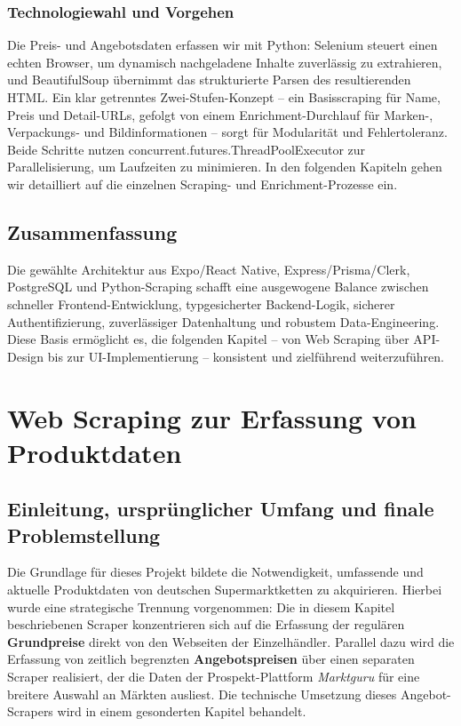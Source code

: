 \documentclass[12pt, a4paper]{report} %
\begin{document}
\subsection{Technologiewahl und Vorgehen}
Die Preis- und Angebotsdaten erfassen wir mit Python: Selenium steuert einen echten Browser, um dynamisch nachgeladene Inhalte zuverlässig zu extrahieren, und BeautifulSoup übernimmt das strukturierte Parsen des resultierenden HTML. Ein klar getrenntes Zwei-Stufen-Konzept – ein Basisscraping für Name, Preis und Detail-URLs, gefolgt von einem Enrichment-Durchlauf für Marken-, Verpackungs- und Bildinformationen – sorgt für Modularität und Fehlertoleranz. Beide Schritte nutzen concurrent.futures.ThreadPoolExecutor zur Parallelisierung, um Laufzeiten zu minimieren. In den folgenden Kapiteln gehen wir detailliert auf die einzelnen Scraping- und Enrichment-Prozesse ein.

\section{Zusammenfassung}
Die gewählte Architektur aus Expo/React Native, Express/Prisma/Clerk, PostgreSQL und Python-Scraping schafft eine ausgewogene Balance zwischen schneller Frontend-Entwicklung, typgesicherter Backend-Logik, sicherer Authentifizierung, zuverlässiger Datenhaltung und robustem Data-Engineering. Diese Basis ermöglicht es, die folgenden Kapitel – von Web Scraping über API-Design bis zur UI-Implementierung – konsistent und zielführend weiterzuführen.

\chapter{Web Scraping zur Erfassung von Produktdaten}
\label{chap:web_scraping}

\section{Einleitung, ursprünglicher Umfang und finale Problemstellung}
Die Grundlage für dieses Projekt bildete die Notwendigkeit, umfassende und aktuelle Produktdaten von deutschen Supermarktketten zu akquirieren. Hierbei wurde eine strategische Trennung vorgenommen: Die in diesem Kapitel beschriebenen Scraper konzentrieren sich auf die Erfassung der regulären \textbf{Grundpreise} direkt von den Webseiten der Einzelhändler. Parallel dazu wird die Erfassung von zeitlich begrenzten \textbf{Angebotspreisen} über einen separaten Scraper realisiert, der die Daten der Prospekt-Plattform \textit{Marktguru} für eine breitere Auswahl an Märkten ausliest. Die technische Umsetzung dieses Angebot-Scrapers wird in einem gesonderten Kapitel behandelt.
\end{document}
